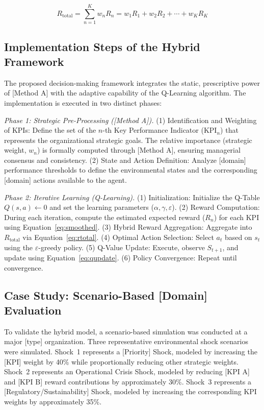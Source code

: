 \documentclass[10pt,twocolumn]{article}
\begin{document}
\begin{equation}
  R_{\mathrm{total}} = \sum_{n=1}^{K} w_n R_n
  = w_1 R_1 + w_2 R_2 + \cdots + w_K R_K
  \label{eq:rtotal}
\end{equation}

\subsection{Implementation Steps of the Hybrid Framework}

The proposed decision-making framework integrates the static,
prescriptive power of [Method A] with the adaptive capability of
the Q-Learning algorithm. The implementation is executed in two
distinct phases:

\textit{Phase 1: Strategic Pre-Processing ([Method A]).}
(1) Identification and Weighting of KPIs: Define the set of the
$n$-th Key Performance Indicator ($\text{KPI}_n$) that represents
the organizational strategic goals. The relative importance
(strategic weight, $w_n$) is formally computed through [Method A],
ensuring managerial consensus and consistency. (2) State and
Action Definition: Analyze [domain] performance thresholds to
define the environmental states and the corresponding [domain]
actions available to the agent.

\textit{Phase 2: Iterative Learning (Q-Learning).}
(1) Initialization: Initialize the Q-Table $Q(s,a)\leftarrow 0$
and set the learning parameters ($\alpha, \gamma, \varepsilon$).
(2) Reward Computation: During each iteration, compute the
estimated expected reward ($R_n$) for each KPI using
Equation~\eqref{eq:smoothed}. (3) Hybrid Reward Aggregation:
Aggregate into $R_{\mathrm{total}}$ via Equation~\eqref{eq:rtotal}.
(4) Optimal Action Selection: Select $a_t$ based on $s_t$ using
the $\varepsilon$-greedy policy. (5) Q-Value Update: Execute,
observe $S_{t+1}$, and update using
Equation~\eqref{eq:qupdate}. (6) Policy Convergence: Repeat until
convergence.

\subsection{Case Study: Scenario-Based [Domain] Evaluation}

To validate the hybrid model, a scenario-based simulation was
conducted at a major [type] organization. Three representative
environmental shock scenarios were simulated. Shock~1 represents a
[Priority] Shock, modeled by increasing the [KPI] weight by 40\%
while proportionally reducing other strategic weights. Shock~2
represents an Operational Crisis Shock, modeled by reducing [KPI
A] and [KPI B] reward contributions by approximately 30\%.
Shock~3 represents a [Regulatory/Sustainability] Shock, modeled by
increasing the corresponding KPI weights by approximately 35\%.
\end{document}

